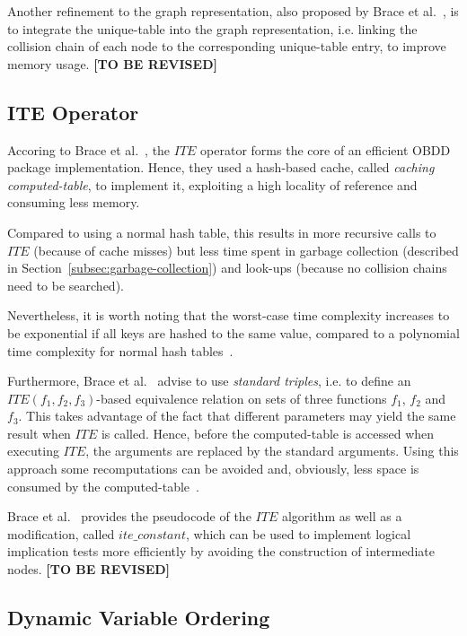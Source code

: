 \documentclass{vldb}
\newcommand{\tbr}{\textbf{[TO BE REVISED]}}
\begin{document}
Another refinement to the graph representation, also proposed by Brace et
al.~\cite{BRACE90}, is to integrate the unique-table into the graph representation,
i.e. linking the collision chain of each node to the corresponding unique-table
entry, to improve memory usage. \tbr

\subsection{ITE Operator}
\label{subsec:ite-operator}

Accoring to Brace et al.~\cite{BRACE90}, the $ITE$ operator forms the core of an
efficient OBDD package implementation. Hence, they used a hash-based cache, called
\textit{caching computed-table}, to implement it, exploiting a high locality of
reference and consuming less memory.

Compared to using a normal hash table, this results in more recursive calls to 
$ITE$ (because of cache misses) but less time spent in garbage collection
(described in Section~\ref{subsec:garbage-collection}) and look-ups (because no
collision chains need to be searched).

Nevertheless, it is worth noting that the worst-case time complexity increases
to be exponential if all keys are hashed to the same value, compared to a
polynomial time complexity for normal hash tables~\cite{BRACE90}. 

Furthermore, Brace et al.~\cite{BRACE90} advise to use \textit{standard triples},
i.e. to define an $ITE(f_1, f_2, f_3)$-based equivalence relation on sets of
three functions $f_1$, $f_2$ and $f_3$. This takes advantage of the fact that
different parameters may yield the same result when $ITE$ is called. Hence, before
the computed-table is accessed when executing $ITE$, the arguments are replaced
by the standard arguments. Using this approach some recomputations can be avoided
and, obviously, less space is consumed by the computed-table~\cite{BRACE90}.

Brace et al.~\cite[p. 42]{BRACE90} provides the pseudocode of the $ITE$ algorithm
as well as a modification, called $ite\_constant$, which can be used to implement
logical implication tests more efficiently by avoiding the construction of
intermediate nodes. \tbr

\subsection{Dynamic Variable Ordering}
\label{subsec:dynamic-variable-ordering}
\end{document}

